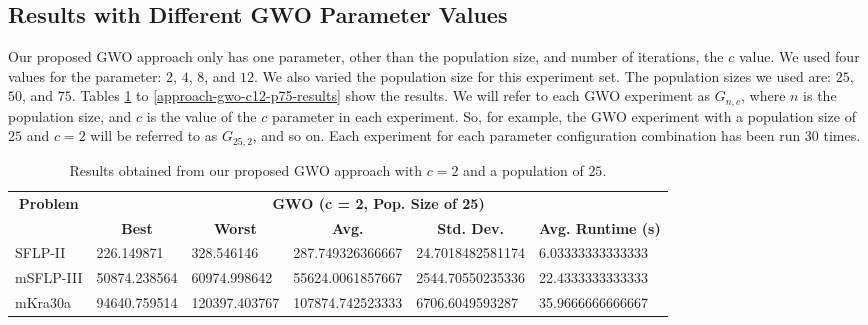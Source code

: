 \subsection{Results with Different GWO Parameter Values}
Our proposed GWO approach only has one parameter, other than the population size, and number of iterations, the $c$ value. We used four values for the parameter: $2$, $4$, $8$, and $12$. We also varied the population size for this experiment set. The population sizes we used are: $25$, $50$, and $75$. Tables \ref{approach-gwo-c2-p25-results} to \ref{approach-gwo-c12-p75-results} show the results. We will refer to each GWO experiment as $G_{n,c}$, where $n$ is the population size, and $c$ is the value of the $c$ parameter in each experiment. So, for example, the GWO experiment with a population size of $25$ and $c = 2$ will be referred to as $G_{25,2}$, and so on. Each experiment for each parameter configuration combination has been run 30 times.

\begin{table}[h!]
\begin{adjustwidth}{-1.18in}{}
	\centering
	\begin{tabular}{|l|l|l|l|l|l|}
	\hline
	\multicolumn{1}{|c|}{\multirow{2}{*}{\textbf{Problem}}} & \multicolumn{5}{c|}{\textbf{GWO (c = 2, Pop. Size of 25)}} \\ \cline{2-6} 
	\multicolumn{1}{|c|}{}                                  & \multicolumn{1}{c|}{\textbf{Best}} & \multicolumn{1}{c|}{\textbf{Worst}} & \multicolumn{1}{c|}{\textbf{Avg.}} & \multicolumn{1}{c|}{\textbf{Std. Dev.}} & \multicolumn{1}{c|}{\textbf{Avg. Runtime (s)}} \\ \hline
	SFLP-II                                                 & 226.149871                                  & 328.546146                                   & 287.749326366667                      & 24.7018482581174                                 & 6.03333333333333                                  \\ \hline
	mSFLP-III                                               & 50874.238564                                & 60974.998642                                 & 55624.0061857667						         & 2544.70550235336                              & 22.4333333333333                               \\ \hline
	mKra30a                                               & 94640.759514                                & 120397.403767                                 &
	107874.742523333							&
	6706.6049593287							&
	35.9666666666667						\\ \hline
	\end{tabular}
\end{adjustwidth}
\caption{Results obtained from our proposed GWO approach with $c = 2$ and a population of $25$.}
\label{approach-gwo-c2-p25-results}
\end{table}

